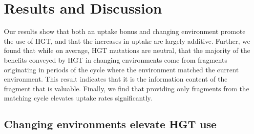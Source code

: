 \documentclass[PhD]{msu-thesis}
\begin{document}
\section{Results and Discussion}
Our results show that both an uptake bonus and changing environment promote the use of HGT, and that the increases in uptake are largely additive. Further, we found that while on average, HGT mutations are neutral, that the majority of the benefits conveyed by HGT in changing environments come from fragments originating in periods of the cycle where the environment matched the current environment. This result indicates that it is the information content of the fragment that is valuable. Finally, we find that providing only fragments from the matching cycle elevates uptake rates significantly.

\subsection{Changing environments elevate HGT use}
\end{document}
